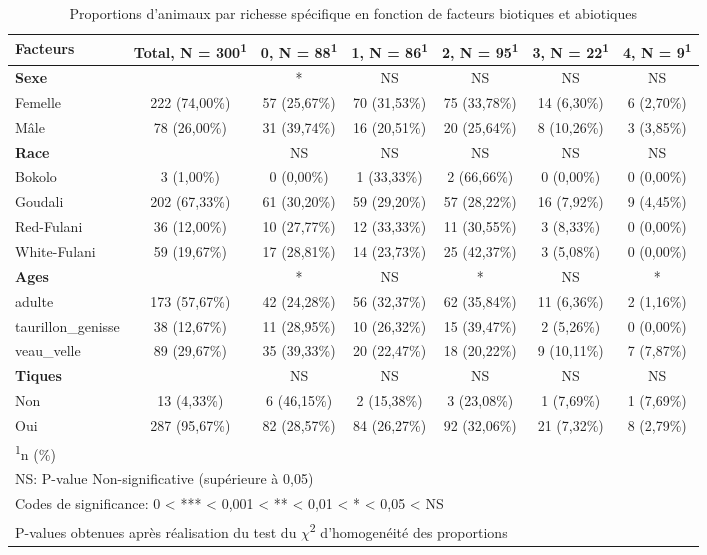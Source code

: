 \blandscape

\begin{longtable}{lcccccc}
	
	\caption{\label{tab:proportions_of_coinfestations_by_factors}Proportions d'animaux par richesse spécifique en fonction de facteurs biotiques et abiotiques} \\
	\toprule
	
	Facteurs & \textbf{Total}, N = 300\textsuperscript{1} & \textbf{0}, N = 88\textsuperscript{1} & \textbf{1}, N = 86\textsuperscript{1} & \textbf{2}, N = 95\textsuperscript{1} & \textbf{3}, N = 22\textsuperscript{1} & \textbf{4}, N = 9\textsuperscript{1} \\ 
	\midrule
	\textbf{Sexe} &  & * & NS & NS & NS & NS \\  
	Femelle & 222 (74,00\%) & 57 (25,67\%) & 70 (31,53\%) & 75 (33,78\%) & 14 (6,30\%) & 6 (2,70\%)  \\ 
	Mâle & 78 (26,00\%) & 31 (39,74\%) & 16 (20,51\%) & 20 (25,64\%) & 8 (10,26\%) & 3 (3,85\%)  \\
	\midrule
	\textbf{Race} &  & NS & NS & NS & NS & NS \\ 
	Bokolo & 3 (1,00\%) & 0 (0,00\%) & 1 (33,33\%) & 2 (66,66\%) & 0 (0,00\%) & 0 (0,00\%)  \\ 
	Goudali & 202 (67,33\%) & 61 (30,20\%) & 59 (29,20\%) & 57 (28,22\%) & 16 (7,92\%) & 9 (4,45\%)  \\ 
	Red-Fulani & 36 (12,00\%) & 10 (27,77\%) & 12 (33,33\%) & 11 (30,55\%) & 3 (8,33\%) & 0 (0,00\%)  \\ 
	White-Fulani & 59 (19,67\%) & 17 (28,81\%) & 14 (23,73\%) & 25 (42,37\%) & 3 (5,08\%) & 0 (0,00\%)  \\ 
	\midrule
	\textbf{Ages} &  & * & NS & * & NS & * \\ 
	adulte & 173 (57,67\%) & 42 (24,28\%) & 56 (32,37\%) & 62 (35,84\%) & 11 (6,36\%) & 2 (1,16\%)  \\ 
	taurillon\_genisse & 38 (12,67\%) & 11 (28,95\%) & 10 (26,32\%) & 15 (39,47\%) & 2 (5,26\%) & 0 (0,00\%)  \\ 
	veau\_velle & 89 (29,67\%) & 35 (39,33\%) & 20 (22,47\%) & 18 (20,22\%) & 9 (10,11\%) & 7 (7,87\%)  \\ 
	\midrule
	\textbf{Tiques} & & NS & NS & NS & NS & NS \\ 
	Non & 13 (4,33\%) & 6 (46,15\%) & 2 (15,38\%) & 3 (23,08\%) & 1 (7,69\%) & 1 (7,69\%)  \\ 
	Oui & 287 (95,67\%) & 82 (28,57\%) & 84 (26,27\%) & 92 (32,06\%) & 21 (7,32\%) & 8 (2,79\%) \\
	\midrule
	\multicolumn{7}{l}{\textsuperscript{1}n (\%)} \\
	\multicolumn{7}{l}{NS: P-value Non-significative (supérieure à 0,05)} \\
	\multicolumn{7}{l}{Codes de significance: 0 < *** < 0,001 < ** < 0,01 < * < 0,05 < NS } \\
	\multicolumn{7}{l}{P-values obtenues après réalisation du test du $\chi$\textsuperscript{2} d'homogenéité des proportions} \\
	\bottomrule
\end{longtable}

